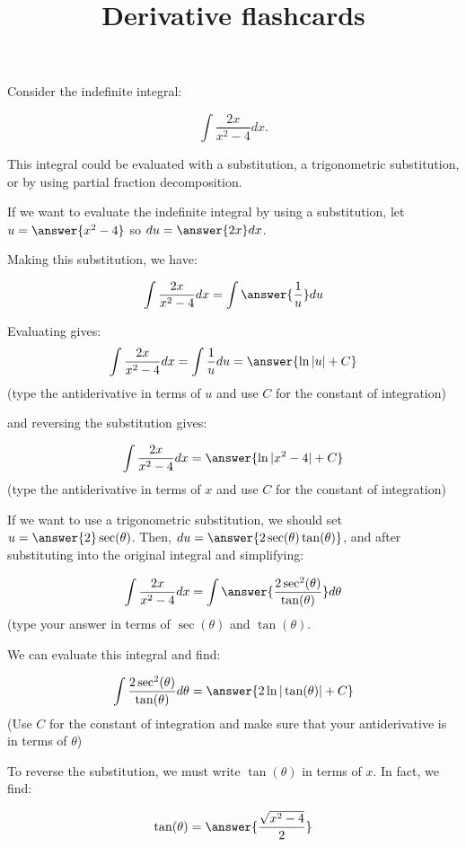 \documentclass{ximera}
\title{Derivative flashcards}
\begin{document}
\begin{exercise}
Consider the indefinite integral:
 
\[
\int \frac{2x}{x^2-4} dx.
\]
 
This integral could be evaluated with a substitution, a trigonometric substitution, or by using partial fraction decomposition.
 
If we want to evaluate the indefinite integral by using a substitution, let $u= \answer{x^2-4}$ so $du = \answer{2x} dx$.
 
\begin{exercise}
Making this substitution, we have:
 
\[
\int \frac{2x}{x^2-4} dx = \int \answer{\frac{1}{u}} du
\]
\begin{exercise}
Evaluating gives:
\[
\int \frac{2x}{x^2-4} dx = \int\frac{1}{u} du = \answer{\ln|u|+C}
\]
(type the antiderivative in terms of $u$ and use $C$ for the constant of integration)
 
and reversing the substitution gives:
 
\[
\int \frac{2x}{x^2-4} dx = \answer{\ln|x^2-4|+C}
\]
(type the antiderivative in terms of $x$ and use $C$ for the constant of integration)
\end{exercise}
\end{exercise}
\begin{exercise}
If we want to use a trigonometric substitution, we should set $u=\answer{2} \sec(\theta)$.  Then, $du = \answer{2 \sec(\theta)\tan(\theta)}$, and after substituting into the original integral and simplifying:
 
\[
\int \frac{2x}{x^2-4} dx = \int \answer{\frac{2 \sec^2(\theta)}{\tan(\theta)}} d\theta
\]
(type your answer in terms of $\sec(\theta)$ and $\tan(\theta)$.
 
\begin{exercise}
We can evaluate this integral and find:
 
\[
 \int \frac{2 \sec^2(\theta)}{\tan(\theta)} d\theta = \answer{2 \ln|\tan(\theta)|+C}
\]
(Use $C$ for the constant of integration and make sure that your antiderivative is in terms of $\theta$)
 
\begin{exercise}
 
To reverse the substitution, we must write $\tan(\theta)$ in terms of $x$.  In fact, we find:
 
\[
\tan(\theta) = \answer{\frac{\sqrt{x^2-4}}{2}}
\]
 

\end{exercise}
\end{exercise}
\end{exercise}
\end{exercise}
\end{document}
